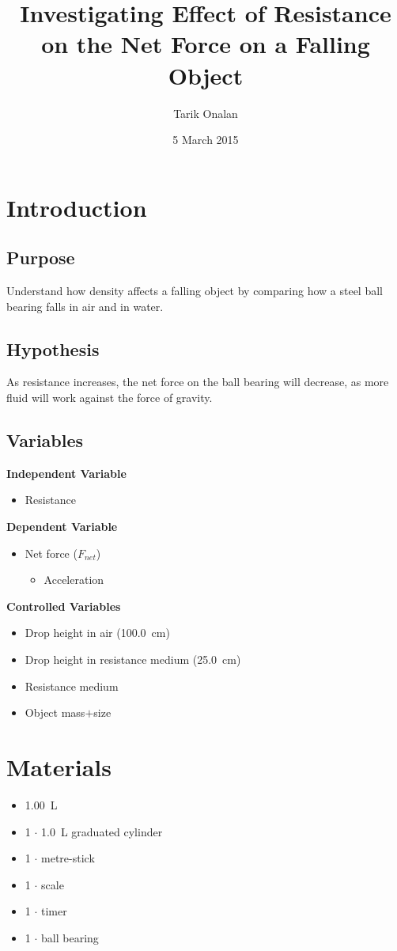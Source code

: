 \documentclass[a4paper]{article}
\title{Investigating Effect of Resistance on the Net Force on a Falling Object}
\date{5 March 2015}
\author{Tarik Onalan}
\begin{document}
    \maketitle
    \section{Introduction}
        \subsection{Purpose}
            Understand how density affects a falling object by comparing how a
            steel ball bearing falls in air and in water.
        \subsection{Hypothesis}
            As resistance increases, the net force on the ball bearing will decrease,
            as more fluid will work against the force of gravity.
        \subsection{Variables}
            \textbf{Independent Variable}
            \begin{itemize}
                \item Resistance
            \end{itemize}
            \textbf{Dependent Variable}
            \begin{itemize}
                \item Net force ($F_{net}$)
                \begin{itemize}
                    \item Acceleration
                \end{itemize}
            \end{itemize}
            \textbf{Controlled Variables}
            \begin{itemize}
                \item Drop height in air (\SI{100.0}{\cm})
                \item Drop height in resistance medium (\SI{25.0}{\cm})
                \item Resistance medium
                \item Object mass$+$size
            \end{itemize}
    \section{Materials}
        \begin{itemize}
            \item \SI{1.00}{\L} 
            \item 1 $\cdot$ \SI{1.0}{\L} graduated cylinder
            \item 1 $\cdot$ metre-stick
            \item 1 $\cdot$ scale
            \item 1 $\cdot$ timer
            \item 1 $\cdot$ ball bearing
        \end{itemize}
\end{document}
